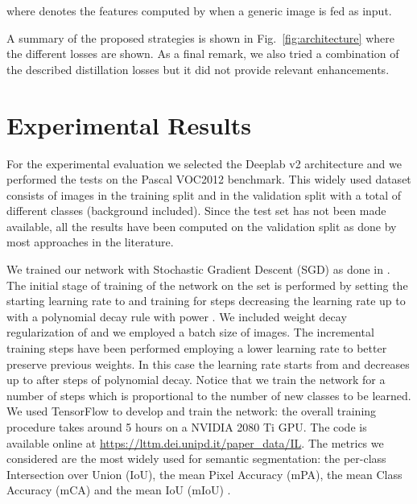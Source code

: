 \documentclass[10pt,twocolumn,letterpaper]{article}
\begin{document}
where  denotes the features computed by  when a generic image  is fed as input. 



A summary of the proposed strategies is shown in Fig.~\ref{fig:architecture} where the different losses are shown.
As a final remark, we also tried a combination of the described distillation losses but it did not provide relevant enhancements.








 \section{Experimental Results}
\label{sec:results}

For the experimental evaluation we selected the Deeplab v2 architecture and we performed the tests on the Pascal VOC2012 \cite{pascalvoc2012} benchmark. This widely used dataset consists of  images in the training split and  in the validation split with a total of  different classes (background included). Since the test set has not been made available, all the results have been computed on the validation split as done by most approaches in the literature.

We trained our network with Stochastic Gradient Descent (SGD) as done in \cite{chen2018deeplab}. The initial stage of training of the network on the set  is performed by setting the starting learning rate to  and training for  steps  decreasing the learning rate up to  with a polynomial decay rule with power . 
We included weight decay regularization of  and we employed a batch size of  images. 
The incremental training steps  have been performed employing a lower learning rate to better preserve previous weights. In this case the learning rate starts from  and decreases up to  after   steps of polynomial decay. Notice that we train the network for a number of steps which is proportional to the number of new classes to be learned. We used TensorFlow \cite{abadi2016tensorflow} to develop and train the network: the overall training procedure takes around 5 hours on a NVIDIA 2080 Ti GPU. The code is available online  at \url{https://lttm.dei.unipd.it/paper_data/IL}.
The metrics we considered are the most widely used for semantic segmentation: the per-class Intersection over Union (IoU), the mean Pixel Accuracy (mPA), the mean Class Accuracy (mCA) and the mean IoU (mIoU) \cite{csurka2013good}.
\end{document}
